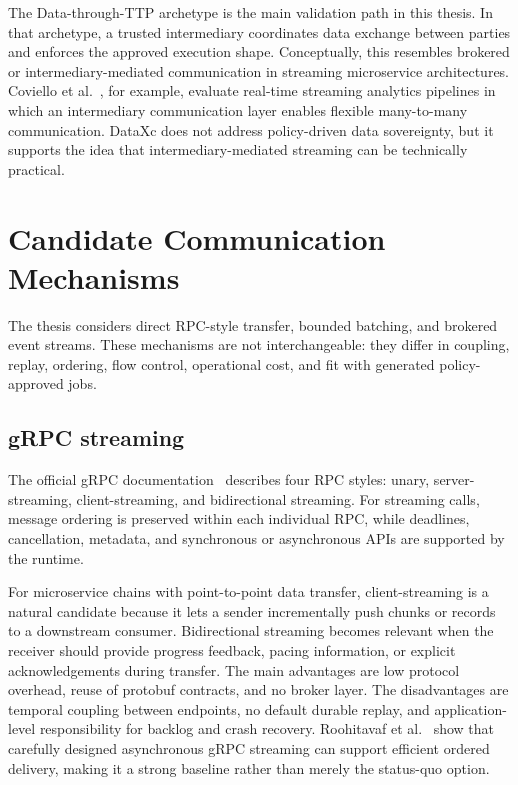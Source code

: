 The Data-through-TTP archetype is the main validation path in this thesis. In that archetype, a trusted intermediary coordinates data exchange between parties and enforces the approved execution shape. Conceptually, this resembles brokered or intermediary-mediated communication in streaming microservice architectures. Coviello et al.~\cite{coviello2022dataxc}, for example, evaluate real-time streaming analytics pipelines in which an intermediary communication layer enables flexible many-to-many communication. DataXc does not address policy-driven data sovereignty, but it supports the idea that intermediary-mediated streaming can be technically practical.

\section{Candidate Communication Mechanisms}

The thesis considers direct RPC-style transfer, bounded batching, and brokered event streams. These mechanisms are not interchangeable: they differ in coupling, replay, ordering, flow control, operational cost, and fit with generated policy-approved jobs.

\subsection{gRPC streaming}

The official gRPC documentation~\cite{grpc2024coreconcepts} describes four RPC styles: unary, server-streaming, client-streaming, and bidirectional streaming. For streaming calls, message ordering is preserved within each individual RPC, while deadlines, cancellation, metadata, and synchronous or asynchronous APIs are supported by the runtime.

For microservice chains with point-to-point data transfer, client-streaming is a natural candidate because it lets a sender incrementally push chunks or records to a downstream consumer. Bidirectional streaming becomes relevant when the receiver should provide progress feedback, pacing information, or explicit acknowledgements during transfer. The main advantages are low protocol overhead, reuse of protobuf contracts, and no broker layer. The disadvantages are temporal coupling between endpoints, no default durable replay, and application-level responsibility for backlog and crash recovery. Roohitavaf et al.~\cite{roohitavaf2019logplayer} show that carefully designed asynchronous gRPC streaming can support efficient ordered delivery, making it a strong baseline rather than merely the status-quo option.

